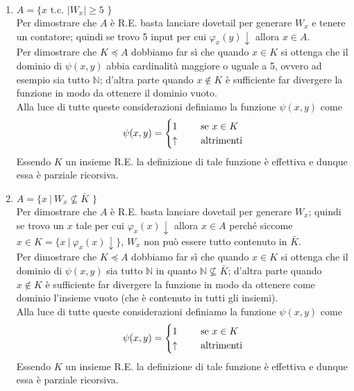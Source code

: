 \documentclass[a4paper,oneside,titlepage]{book}
\begin{document}
\begin{enumerate}[label=\fbox{\arabic*}]
\item $A = \text{\{ } x \text{ t.c. } |W_x| \geq 5 \text{ \}}$
\\ Per dimostrare che $A$ è R.E. basta lanciare dovetail per generare $W_x$ e tenere un contatore; quindi se trovo 5 input per cui $\varphi_x(y)\downarrow$ allora $x \in A$.
\\ Per dimostrare che $K \preceq A$ dobbiamo far sì che quando $x \in K$ si ottenga che il dominio di $\psi(x,y)$ abbia cardinalità maggiore o uguale a 5, ovvero ad esempio sia tutto $\mathbb{N}$; d'altra parte quando $x \notin K$ è sufficiente far divergere la funzione in modo da ottenere il dominio vuoto.
\\ Alla luce di tutte queste considerazioni definiamo la funzione $\psi(x,y)$ come
\[
\psi(x,y) =
\begin{cases}
1& \hspace{0.5cm} \text{se } x \in K \\
\uparrow& \hspace{0.5cm} \text{altrimenti}
\end{cases}
\]
Essendo $K$ un insieme R.E. la definizione di tale funzione è effettiva e dunque essa è parziale ricorsiva.

\item $A = \text{\{ } x \ | \ W_x \nsubseteq \bar{K} \text{ \}}$
\\ Per dimostrare che $A$ è R.E. basta lanciare dovetail per generare $W_x$; quindi se trovo un $x$ tale per cui $\varphi_x(x)\downarrow$ allora $x \in A$ perché siccome $x \in K = \{ x \ | \ \varphi_x(x)\downarrow \}$, $W_x$ non può essere tutto contenuto in $\bar{K}$.
\\ Per dimostrare che $K \preceq A$ dobbiamo far sì che quando $x \in K$ si ottenga che il dominio di $\psi(x,y)$ sia tutto $\mathbb{N}$ in quanto $\mathbb{N} \nsubseteq \bar{K}$; d'altra parte quando $x \notin K$ è sufficiente far divergere la funzione in modo da ottenere come dominio l'insieme vuoto (che è contenuto in tutti gli insiemi).
\\ Alla luce di tutte queste considerazioni definiamo la funzione $\psi(x,y)$ come
\[
\psi(x,y) =
\begin{cases}
1& \hspace{0.5cm} \text{se } x \in K \\
\uparrow& \hspace{0.5cm} \text{altrimenti}
\end{cases}
\]
Essendo $K$ un insieme R.E. la definizione di tale funzione è effettiva e dunque essa è parziale ricorsiva.
\end{enumerate}
\end{document}
